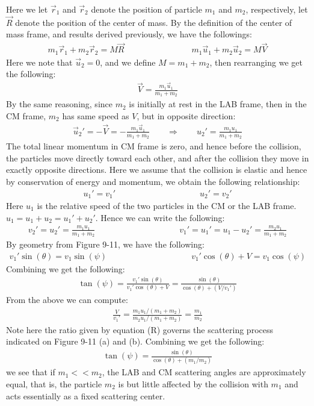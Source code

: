 \documentclass[11pt,oneside]{book}
\theoremstyle{break}
\theoremstyle{break}
\begin{document}
Here we let $\vec{r}_1$ and $\vec{r}_2$ denote the position of particle $m_1$ and $m_2$, respectively, let $\vec{R}$ denote the position of the center of mass. By the definition of the center of mass frame, and results derived previously, we have the followings:
\begin{align*}
m_1\vec{r}_1 + m_2 \vec{r}_2 = M\vec{R} \qquad\qquad\qquad\qquad m_1\vec{u}_1 + m_2 \vec{u}_2 = M\vec{V}
\end{align*}
Here we note that $\vec{u}_2 = 0$, and we define $M= m_1 + m_2$, then rearranging we get the following:
\begin{align*}
\vec{V} = \frac{m_1 \vec{u}_1}{m_1+m_2}
\end{align*}
By the same reasoning, since $m_2$ is initially at rest in the LAB frame, then in the CM frame, $m_2$ has same speed as $V$, but in opposite direction:
\begin{align*}
\vec{u}_2' = -\vec{V} = -\frac{m_1\vec{u}_1}{m_1+m_2}\qquad \Rightarrow \qquad u_2' = \frac{m_1 u_1}{m_1 + m_2}
\end{align*}
The total linear momentum in CM frame is zero, and hence before the collision, the particles move directly toward each other, and after the collision they move in exactly opposite directions. Here we assume that the collision is elastic and hence by conservation of energy and momentum, we obtain the following relationship:
\begin{align*}
u_1' = v_1' \qquad\qquad\qquad\qquad\qquad u_2' = v_2'
\end{align*}
Here $u_1$ is the relative speed of the two particles in the CM or the LAB frame. $u_1 = u_1 + u_2 = u_1' + u_2'$. Hence we can write the following:
\begin{align*}
v_2' = u_2' = 
\frac{m_1 u_1}{m_1 + m_2}
\qquad\qquad\qquad\qquad\qquad 
v_1' = u_1' = u_1 - u_2' =
\frac{m_2 u_1}{m_1 + m_2}
\end{align*}
By geometry from Figure 9-11, we have the following:
\begin{align*}
v_1' \sin(\theta) = v_1 \sin(\psi)\qquad\qquad\qquad\qquad\qquad v_1' \cos(\theta) +V = v_1 \cos(\psi)
\end{align*}
Combining we get the following:
\begin{align*}
\tan(\psi) = \frac{v_1' \sin(\theta)}{v_1' \cos(\theta) +V} = \frac{\sin(\theta)}{\cos(\theta) +(V/v_1')}
\end{align*}
From the above we can compute:
\begin{align*}
\frac{V}{v_1'} = \frac{m_1 u_1/(m_1+m_2)}{m_2 u_1 /(m_1 +m_2)} = \frac{m_1}{m_2} \tag{R}
\end{align*}
Note here the ratio given by equation (R) governs the scattering process indicated on Figure 9-11 (a) and (b). Combining we get the following:
\begin{align*}
\tan(\psi) = \frac{\sin(\theta)}{\cos(\theta) + (m_1/m_2)}
\end{align*}
we see that if $m_1 << m_2$, the LAB and CM scattering angles are approximately equal, that is, the particle $m_2$ is but little affected by the collision with $m_1$ and acts essentially as a fixed scattering center.\\
\end{document}

